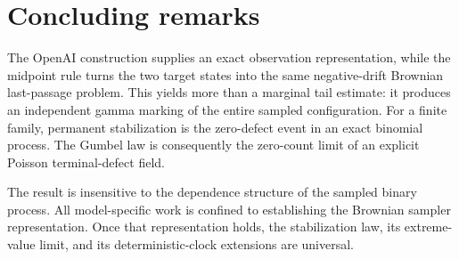 \section{Concluding remarks}

The OpenAI construction supplies an exact observation representation, while
the midpoint rule turns the two target states into the same negative-drift
Brownian last-passage problem.  This yields more than a marginal tail estimate:
it produces an independent gamma marking of the entire sampled configuration.
For a finite family, permanent stabilization is the zero-defect event in an
exact binomial process.  The Gumbel law is consequently the zero-count limit of
an explicit Poisson terminal-defect field.

The result is insensitive to the dependence structure of the sampled binary
process.  All model-specific work is confined to establishing the Brownian
sampler representation.  Once that representation holds, the stabilization
law, its extreme-value limit, and its deterministic-clock extensions are
universal.



